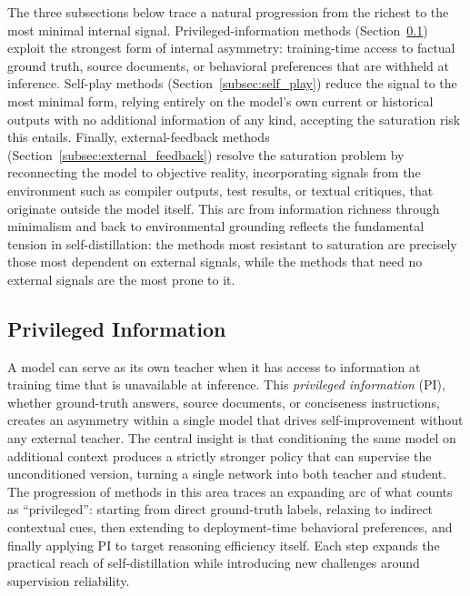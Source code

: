 \documentclass{article} %
\begin{document}
The three subsections below trace a natural progression from the richest to the most minimal internal signal. Privileged-information methods (Section~\ref{subsec:privileged_info}) exploit the strongest form of internal asymmetry: training-time access to factual ground truth, source documents, or behavioral preferences that are withheld at inference. Self-play methods (Section~\ref{subsec:self_play}) reduce the signal to the most minimal form, relying entirely on the model's own current or historical outputs with no additional information of any kind, accepting the saturation risk this entails. Finally, external-feedback methods (Section~\ref{subsec:external_feedback}) resolve the saturation problem by reconnecting the model to objective reality, incorporating signals from the environment such as compiler outputs, test results, or textual critiques, that originate outside the model itself. This arc from information richness through minimalism and back to environmental grounding reflects the fundamental tension in self-distillation: the methods most resistant to saturation are precisely those most dependent on external signals, while the methods that need no external signals are the most prone to it.

\subsection{Privileged Information}
\label{subsec:privileged_info}

A model can serve as its own teacher when it has access to information at training time that is unavailable at inference. This \emph{privileged information} (PI), whether ground-truth answers, source documents, or conciseness instructions, creates an asymmetry within a single model that drives self-improvement without any external teacher. The central insight is that conditioning the same model on additional context produces a strictly stronger policy that can supervise the unconditioned version, turning a single network into both teacher and student. The progression of methods in this area traces an expanding arc of what counts as ``privileged'': starting from direct ground-truth labels, relaxing to indirect contextual cues, then extending to deployment-time behavioral preferences, and finally applying PI to target reasoning efficiency itself. Each step expands the practical reach of self-distillation while introducing new challenges around supervision reliability.
\end{document}

